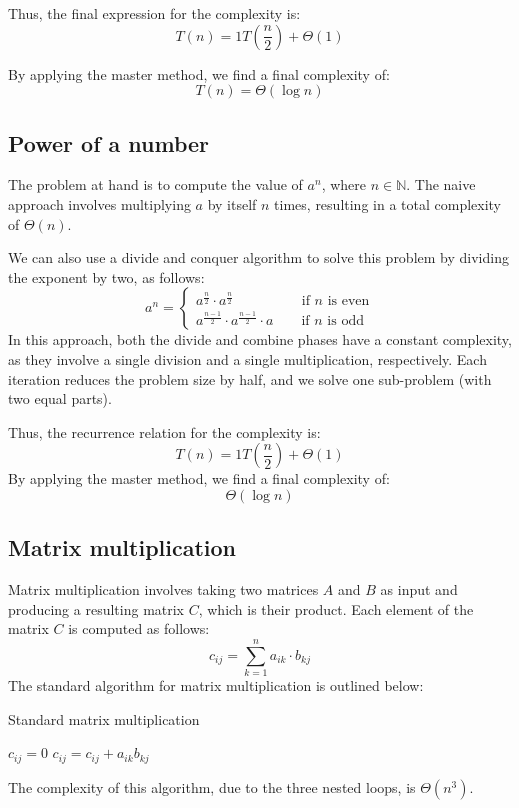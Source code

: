 Thus, the final expression for the complexity is:
\[T(n)=1T\left(\dfrac{n}{2}\right)+\Theta(1)\]

By applying the master method, we find a final complexity of:
\[T(n)=\Theta(\log n)\]

\subsection{Power of a number}
The problem at hand is to compute the value of $a^n$, where $n\in\mathbb{N}$. 
The naive approach involves multiplying $a$ by itself $n$ times, resulting in a total complexity of $\Theta(n)$. 

We can also use a divide and conquer algorithm to solve this problem by dividing the exponent by two, as follows:
\[a^n=\begin{cases} a^\frac{n}{2}\cdot a^\frac{n}{2}  \:\:\:\:\qquad\qquad \text{if }n\text{ is even} \\ a^\frac{n-1}{2}\cdot a^\frac{n-1}{2} \cdot a \qquad \text{if }n\text{ is odd} \end{cases}\]
In this approach, both the divide and combine phases have a constant complexity, as they involve a single division and a single multiplication, respectively. 
Each iteration reduces the problem size by half, and we solve one sub-problem (with two equal parts).

Thus, the recurrence relation for the complexity is:
\[T(n)=1T\left(\dfrac{n}{2}\right)+\Theta(1)\]
By applying the master method, we find a final complexity of:
\[\Theta(\log n)\]

\subsection{Matrix multiplication}
Matrix multiplication involves taking two matrices $A$ and $B$ as input and producing a resulting matrix $C$, which is their product.
Each element of the matrix $C$ is computed as follows:
\[c_{ij}=\sum_{k=1}^{n}a_{ik}\cdot b_{kj}\]
The standard algorithm for matrix multiplication is outlined below:
\begin{algorithm}[H]
    \caption{Standard matrix multiplication}
        \begin{algorithmic}[1]
                    \State $c_{ij} = 0$
                        \State $c_{ij} = c_{ij}+a_{ik} b_{kj}$
                    \EndFor
                \EndFor
            \EndFor
        \end{algorithmic}
\end{algorithm}
The complexity of this algorithm, due to the three nested loops, is $\Theta(n^3)$.

